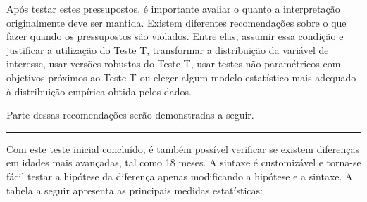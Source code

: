 \documentclass[
]{book}
\newenvironment{Shaded}{\begin{snugshade}}{\end{snugshade}}
\newcommand{\DataTypeTok}[1]{\textcolor[rgb]{0.13,0.29,0.53}{#1}}
\newcommand{\DecValTok}[1]{\textcolor[rgb]{0.00,0.00,0.81}{#1}}
\newcommand{\KeywordTok}[1]{\textcolor[rgb]{0.13,0.29,0.53}{\textbf{#1}}}
\newcommand{\NormalTok}[1]{#1}
\newcommand{\OperatorTok}[1]{\textcolor[rgb]{0.81,0.36,0.00}{\textbf{#1}}}
\newcommand{\StringTok}[1]{\textcolor[rgb]{0.31,0.60,0.02}{#1}}
\begin{document}
Após testar estes pressupostos, é importante avaliar o quanto a
interpretação originalmente deve ser mantida. Existem diferentes
recomendações sobre o que fazer quando os pressupostos são violados.
Entre elas, assumir essa condição e justificar a utilização do Teste T,
transformar a distribuição da variável de interesse, usar versões
robustas do Teste T, usar testes não-paramétricos com objetivos próximos
ao Teste T ou eleger algum modelo estatístico mais adequado à
distribuição empírica obtida pelos dados.

Parte dessas recomendações serão demonstradas a seguir.

\begin{center}\rule{0.5\linewidth}{0.5pt}\end{center}

Com este teste inicial concluído, é também possível verificar se existem
diferenças em idades mais avançadas, tal como 18 meses. A sintaxe é
customizável e torna-se fácil testar a hipótese da diferença apenas
modificando a hipótese e a sintaxe. A tabela a seguir apresenta as
principais medidas estatísticas:

\begin{Shaded}
\end{Shaded}
\end{document}

